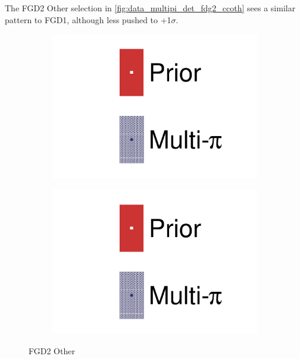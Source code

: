 The FGD2 Other selection in \autoref{fig:data_multipi_det_fdg2_ccoth} sees a similar pattern to FGD1, although less pushed to +1$\sigma$.
\begin{figure}[h]
	\centering
	\begin{subfigure}[t]{0.32\textwidth}
		\includegraphics[width=\textwidth,page=42, trim={0mm 0mm 0mm 0mm}, clip]{figures/mach3/2018/data/2018a_FixedCov_RedCov_Mpi_Data_merge_drawPar_withDet}
	\end{subfigure}
	\begin{subfigure}[t]{0.32\textwidth}
		\includegraphics[width=\textwidth,page=43, trim={0mm 0mm 0mm 0mm}, clip]{figures/mach3/2018/data/2018a_FixedCov_RedCov_Mpi_Data_merge_drawPar_withDet}
	\end{subfigure}
	\caption{FGD2 Other}
	\label{fig:data_multipi_det_fdg2_ccoth}
\end{figure}

